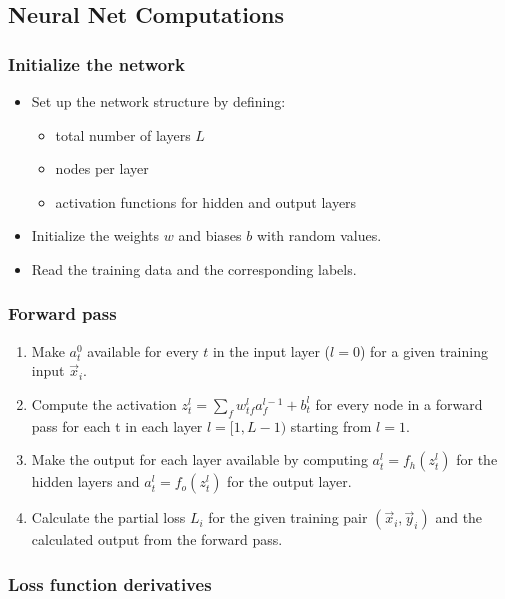 \subsection{Neural Net Computations}

\subsubsection*{Initialize the network}

\begin{itemize}
    \item Set up the network structure by defining:
    \begin{itemize}
        \item total number of layers $L$
        \item nodes per layer
        \item activation functions for hidden and output layers
    \end{itemize}
    \item Initialize the weights $w$ and biases $b$ with random values.
    \item Read the training data and the corresponding labels.
\end{itemize}

\subsubsection*{Forward pass}

\begin{enumerate}
    \item Make $a_t^0$ available for every $t$ in the input layer ($l=0$) for a given
    training input $\vec{x}_i$.
    \item Compute the activation $z_t^l = \sum\limits_{f} w_{tf}^l a_f^{l-1} + b_t^l$ for
    every node in a forward pass for each t in each layer $l = [1,L-1)$ starting from
    $l=1$.
    \item Make the output for each layer available by computing $a_t^l = f_h(z_t^l)$ for
    the hidden layers and $a_t^l = f_o(z_t^l)$ for the output layer.
    \item Calculate the partial loss $L_i$ for the given training pair $(\vec{x}_i,
    \vec{y}_i)$ and the calculated output from the forward pass.
\end{enumerate}

\subsubsection*{Loss function derivatives}

